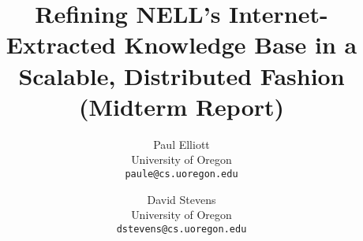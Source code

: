 \documentclass[letterpaper,10pt]{article}
\date{}
\begin{document}
\setcounter{page}{1}
\pagestyle{plain}


\title{\bf Refining NELL's Internet-Extracted Knowledge Base in a Scalable, Distributed Fashion (Midterm Report)}
\author{
{Paul Elliott}\\
University of Oregon\\
\texttt{paule@cs.uoregon.edu}
\and
{David Stevens}\\
University of Oregon\\
\texttt{dstevens@cs.uoregon.edu}
}

\maketitle






\end{document}
